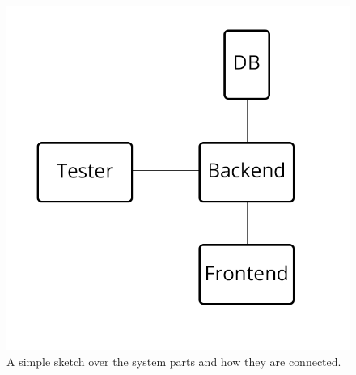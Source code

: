 \begin{figure}[H]

\includegraphics[scale=0.7]{img/SystemA2.png}
\caption{A simple sketch over the system parts and how they are connected.}
\end{figure}